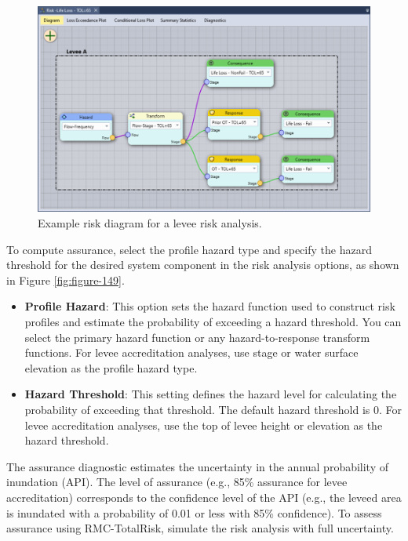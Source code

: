 \documentclass[
]{book}
\begin{document}
\begin{figure}

{\centering \includegraphics{images/figure148} 

}

\caption{Example risk diagram for a levee risk analysis.}\label{fig:figure-148}
\end{figure}

To compute assurance, select the profile hazard type and specify the hazard threshold for the desired system component in the risk analysis options, as shown in Figure \ref{fig:figure-149}.

\begin{itemize}
\item
  \textbf{Profile Hazard}: This option sets the hazard function used to construct risk profiles and estimate the probability of exceeding a hazard threshold. You can select the primary hazard function or any hazard-to-response transform functions. For levee accreditation analyses, use stage or water surface elevation as the profile hazard type.
\item
  \textbf{Hazard Threshold}: This setting defines the hazard level for calculating the probability of exceeding that threshold. The default hazard threshold is 0. For levee accreditation analyses, use the top of levee height or elevation as the hazard threshold.
\end{itemize}

The assurance diagnostic estimates the uncertainty in the annual probability of inundation (API). The level of assurance (e.g., 85\% assurance for levee accreditation) corresponds to the confidence level of the API (e.g., the leveed area is inundated with a probability of 0.01 or less with 85\% confidence). To assess assurance using RMC-TotalRisk, simulate the risk analysis with full uncertainty.
\end{document}
